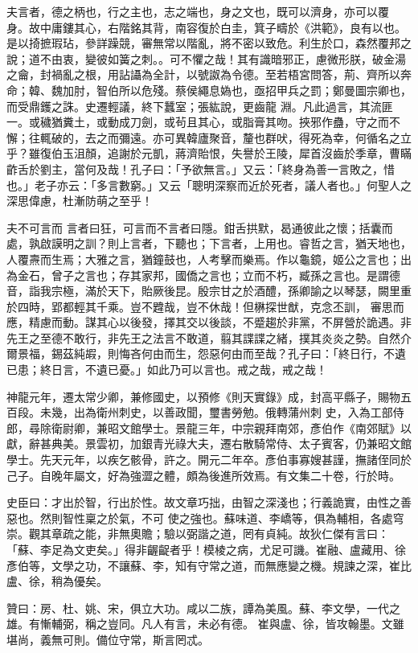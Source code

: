 \begin{pinyinscope}
 夫言者，德之柄也，行之主也，志之端也，身之文也，既可以濟身，亦可以覆
 身。故中庸鏤其心，右階銘其背，南容復於白圭，箕子疇於《洪範》，良有以也。是以掎摭瑕玷，參詳躁競，審無常以階亂，將不密以致危。利生於口，森然覆邦之說；道不由衷，變彼如簧之刺。。可不懼之哉！其有識暗邪正，慮微形朕，破金湯之龠，封禍亂之根，用詀讘為全計，以號詉為令德。至若梧宮問答，荊、齊所以奔命；韓、魏加肘，智伯所以危殘。蔡侯繩息媯也，亟招甲兵之罰；鄭曼圖宗卿也，而受鼎鑊之誅。史遷輕議，終下蠶室；張紘說，更齒龍
 淵。凡此過言，其流匪一。或穢猶糞土，或動成刀劍，或茍且其心，或脂膏其吻。挾邪作蠱，守之而不懈；往輒破的，去之而彌遠。亦可異韓廬聚音，釐也群吠，得死為幸，何循名之立乎？雖復伯玉沮顏，追謝於元凱，蔣濟貽恨，失譽於王陵，犀首沒齒於季章，曹瞞齚舌於劉主，當何及哉！孔子曰：「予欲無言。」又云：「終身為善一言敗之，惜也。」老子亦云：「多言數窮。」又云「聰明深察而近於死者，議人者也。」何聖人之深思偉慮，杜漸防萌之至乎！



 夫不可言而
 言者曰狂，可言而不言者曰隱。鉗舌拱默，曷通彼此之懷；括囊而處，孰啟謨明之訓？則上言者，下聽也；下言者，上用也。睿哲之言，猶天地也，人覆燾而生焉；大雅之言，猶鐘鼓也，人考擊而樂焉。作以龜鏡，姬公之言也；出為金石，曾子之言也；存其家邦，國僑之言也；立而不朽，臧孫之言也。是謂德音，詣我宗極，滿於天下，貽厥後昆。殷宗甘之於酒醴，孫卿諭之以琴瑟，闕里重於四時，郢都輕其千乘。豈不韙哉，豈不休哉！但楙探世猷，克念丕訓，
 審思而應，精慮而動。謀其心以後發，擇其交以後談，不蹙趨於非黨，不屏營於詭遇。非先王之至德不敢行，非先王之法言不敢道，翦其諜諜之緒，撲其炎炎之勢。自然介爾景福，錫茲純嘏，則悔吝何由而生，怨惡何由而至哉？孔子曰：「終日行，不遺已患；終日言，不遺已憂。」如此乃可以言也。戒之哉，戒之哉！



 神龍元年，遷太常少卿，兼修國史，以預修《則天實錄》成，封高平縣子，賜物五百段。未幾，出為衛州刺史，以善政聞，璽書勞勉。俄轉蒲州刺
 史，入為工部侍郎，尋除衛尉卿，兼昭文館學士。景龍三年，中宗親拜南郊，彥伯作《南郊賦》以獻，辭甚典美。景雲初，加銀青光祿大夫，遷右散騎常侍、太子賓客，仍兼昭文館學士。先天元年，以疾乞骸骨，許之。開元二年卒。彥伯事寡嫂甚謹，撫諸侄同於己子。自晚年屬文，好為強澀之體，頗為後進所效焉。有文集二十卷，行於時。



 史臣曰：才出於智，行出於性。故文章巧拙，由智之深淺也；行義詭實，由性之善惡也。然則智性稟之於氣，不可
 使之強也。蘇味道、李嶠等，俱為輔相，各處穹崇。觀其章疏之能，非無奧贍；驗以弼諧之道，罔有貞純。故狄仁傑有言曰：「蘇、李足為文吏矣。」得非齷齪者乎！模棱之病，尤足可譏。崔融、盧藏用、徐彥伯等，文學之功，不讓蘇、李，知有守常之道，而無應變之機。規諫之深，崔比盧、徐，稍為優矣。



 贊曰：房、杜、姚、宋，俱立大功。咸以二族，譚為美風。蘇、李文學，一代之雄。有慚輔弼，稱之豈同。凡人有言，未必有德。
 崔與盧、徐，皆攻翰墨。文雖堪尚，義無可則。備位守常，斯言罔忒。



\end{pinyinscope}